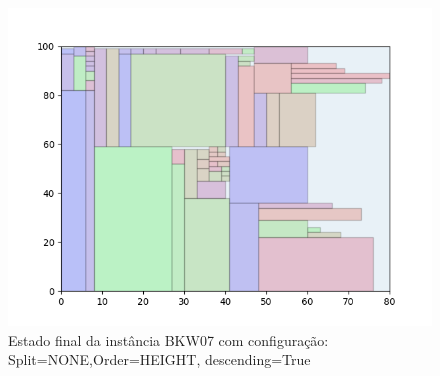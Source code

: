 \begin{figure}[H]
    \centering
    \caption[]{Estado final da instância BKW07 com configuração: Split=NONE,Order=HEIGHT, descending=True}
    \label{fig:bkw07-none-height-true}
    \includegraphics[scale=0.5]{output/figures/bkw/bkw07/none/height/true/00}
\end{figure}